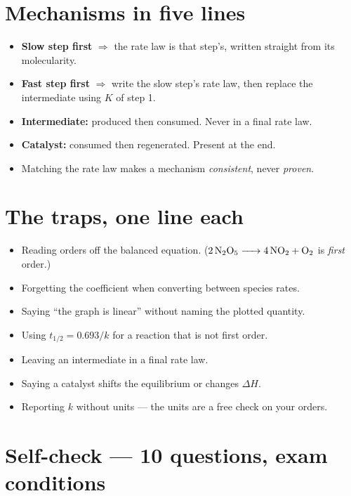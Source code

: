 \documentclass{apchem-worksheet}
\begin{document}
\section*{\sffamily Mechanisms in five lines}

\begin{itemize}[leftmargin=*,itemsep=0.18em]
  \item \textbf{Slow step first} $\Rightarrow$ the rate law is that step's,
        written straight from its molecularity.
  \item \textbf{Fast step first} $\Rightarrow$ write the slow step's rate
        law, then replace the intermediate using $K$ of step 1.
  \item \textbf{Intermediate:} produced then consumed. Never in a final
        rate law.
  \item \textbf{Catalyst:} consumed then regenerated. Present at the end.
  \item Matching the rate law makes a mechanism \emph{consistent}, never
        \emph{proven}.
\end{itemize}

\section*{\sffamily The traps, one line each}

\begin{itemize}[leftmargin=*,itemsep=0.22em]
  \item Reading orders off the balanced equation.
        ($\ce{2N2O5 -> 4NO2 + O2}$ is \emph{first} order.)
  \item Forgetting the coefficient when converting between species rates.
  \item Saying ``the graph is linear'' without naming the plotted quantity.
  \item Using $t_{1/2} = 0.693/k$ for a reaction that is not first order.
  \item Leaving an intermediate in a final rate law.
  \item Saying a catalyst shifts the equilibrium or changes $\Delta H$.
  \item Reporting $k$ without units --- the units are a free check on your
        orders.
\end{itemize}

\section*{\sffamily Self-check --- 10 questions, exam conditions}
\end{document}
